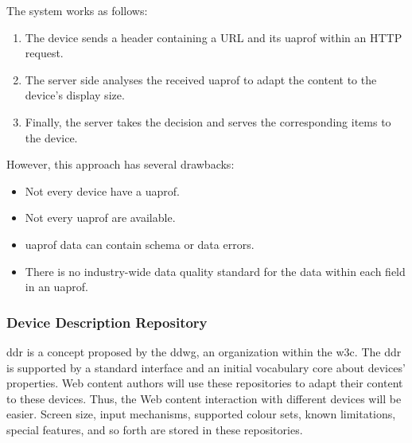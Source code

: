 The system works as follows:

\begin{enumerate}
  \item The device sends a header containing a URL and its \ac{uaprof} within an 
  HTTP request.
  \item The server side analyses the received \ac{uaprof} to adapt the content 
  to the device's display size.
  \item Finally, the server takes the decision and serves the corresponding items
  to the device.
\end{enumerate}


However, this approach has several drawbacks:

\begin{itemize}
 \item Not every device have a \ac{uaprof}.
 \item Not every \ac{uaprof} are available.
 \item \ac{uaprof} data can contain schema or data errors.
 \item There is no industry-wide data quality standard for the data within each
 field in an \ac{uaprof}.
\end{itemize}


% 

\subsubsection{Device Description Repository}
\label{sec:ddr}
\ac{ddr} is a concept proposed by the \ac{ddwg}, an organization within the 
\ac{w3c}. The \ac{ddr} is supported by a standard interface and an initial 
vocabulary core about devices' properties. Web content authors will use these 
repositories to adapt their content to these devices. Thus, the Web content 
interaction with different devices will be easier. Screen size, input mechanisms, 
supported colour sets, known limitations, special features, and so forth are 
stored in these repositories.

